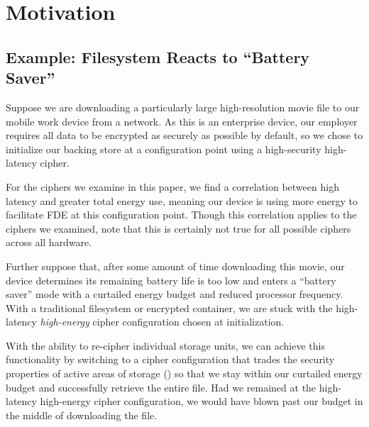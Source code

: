 \section{Motivation}\label{sec:motivation}

\subsection{Example: Filesystem Reacts to ``Battery Saver''}


Suppose we are downloading a particularly large high-resolution movie file to
our mobile work device from a network. As this is an enterprise device, our
employer requires all data to be encrypted as securely as possible by default,
so we chose to initialize our backing store at a configuration point using a
high-security high-latency cipher.

For the ciphers we examine in this paper, we find a correlation between high
latency and greater total energy use, meaning our device is using more
energy to facilitate FDE at this configuration point. Though this correlation
applies to the ciphers we examined, note that this is certainly not true for all
possible ciphers across all hardware.

Further suppose that, after some amount of time downloading this movie, our
device determines its remaining battery life is too low and enters a ``battery
saver'' mode with a curtailed energy budget and reduced processor frequency.
With a traditional filesystem or encrypted container, we are stuck with the
high-latency \emph{high-energy} cipher configuration chosen at initialization.

With the ability to re-cipher individual storage units, we can achieve this
functionality by switching to a cipher configuration that trades the security
properties of active areas of storage () so that we stay within our
curtailed energy budget and successfully retrieve the entire file. Had we
remained at the high-latency high-energy cipher configuration, we would have
blown past our budget in the middle of downloading the file.

